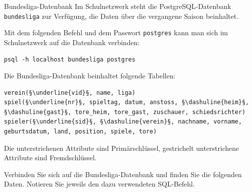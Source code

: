 \documentclass[11pt, a4paper, oneside]{article}
\begin{document}
	\begin{hint}{Bundesliga-Datenbank}
		Im Schulnetzwerk steht die PostgreSQL-Datenbank \texttt{bundesliga} zur Verfügung, die Daten über die vergangene Saison beinhaltet.
		
		Mit dem folgenden Befehl und dem Passwort \texttt{postgres} kann man sich im Schulnetzwerk auf die Datenbank verbinden:
		
		\begin{lstlisting}[numbers=none]
psql -h localhost bundesliga postgres
		\end{lstlisting}
		
		Die Bundesliga-Datenbank beinhaltet folgende Tabellen:
		
%		
%		
		\begin{lstlisting}[numbers=none, frame=none, escapechar=§]
verein(§\underline{vid}§, name, liga)
spiel(§\underline{nr}§, spieltag, datum, anstoss, §\dashuline{heim}§, §\dashuline{gast}§, tore_heim, tore_gast, zuschauer, schiedsrichter)
spieler(§\underline{sid}§, §\dashuline{verein}§, nachname, vorname, geburtsdatum, land, position, spiele, tore)
		\end{lstlisting}
		
		Die unterstrichenen Attribute sind Primärschlüssel, gestrichelt unterstrichene Attribute sind Fremdschlüssel.
	\end{hint}
	
	
	
	Verbinden Sie sich auf die Bundesliga-Datenbank und finden Sie die folgenden Daten.
	Notieren Sie jeweils den dazu verwendeten SQL-Befehl.
	
\end{document}
